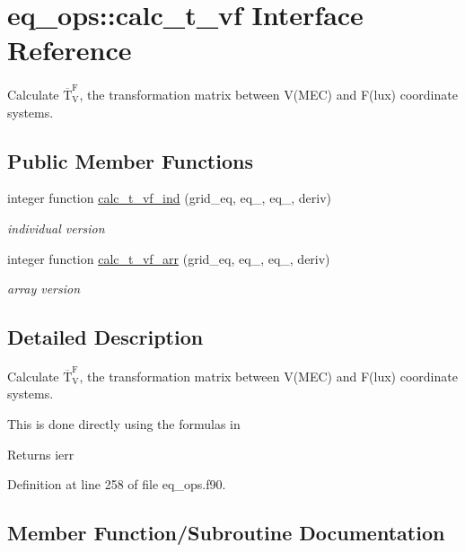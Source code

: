 \hypertarget{interfaceeq__ops_1_1calc__t__vf}{}\section{eq\+\_\+ops\+:\+:calc\+\_\+t\+\_\+vf Interface Reference}
\label{interfaceeq__ops_1_1calc__t__vf}


Calculate $\overline{\text{T}}_\text{V}^\text{F}$, the transformation matrix between V(\+M\+E\+C) and F(lux) coordinate systems.  


\subsection*{Public Member Functions}
\begin{DoxyCompactItemize}
\item 
integer function \hyperlink{interfaceeq__ops_1_1calc__t__vf_a03e04d9c0e2c6f839c578a092bbe47ee}{calc\+\_\+t\+\_\+vf\+\_\+ind} (grid\+\_\+eq, eq\+\_, eq\+\_, deriv)
\begin{DoxyCompactList}\small\item\em individual version \end{DoxyCompactList}\item 
integer function \hyperlink{interfaceeq__ops_1_1calc__t__vf_a011486ab4c748213628917b7fb40d924}{calc\+\_\+t\+\_\+vf\+\_\+arr} (grid\+\_\+eq, eq\+\_, eq\+\_, deriv)
\begin{DoxyCompactList}\small\item\em array version \end{DoxyCompactList}\end{DoxyCompactItemize}


\subsection{Detailed Description}
Calculate $\overline{\text{T}}_\text{V}^\text{F}$, the transformation matrix between V(\+M\+E\+C) and F(lux) coordinate systems. 

This is done directly using the formula\textquotesingle{}s in \cite{Weyens3D}

\begin{DoxyReturn}{Returns}
ierr 
\end{DoxyReturn}


Definition at line 258 of file eq\+\_\+ops.\+f90.



\subsection{Member Function/\+Subroutine Documentation}
\mbox{\label{interfaceeq__ops_1_1calc__t__vf_a011486ab4c748213628917b7fb40d924}} 
